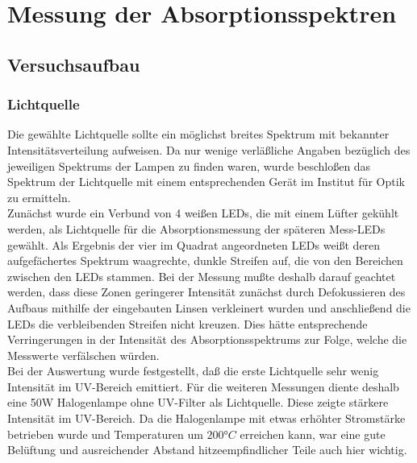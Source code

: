 \documentclass[11pt]{scrartcl}
\begin{document}


\section{Messung der Absorptionsspektren}

\subsection{Versuchsaufbau}
\subsubsection{Lichtquelle} %
Die gew\"ahlte Lichtquelle sollte ein m\"oglichst breites Spektrum mit bekannter Intensit\"atsverteilung aufweisen. Da nur wenige verl\"a\ss{}liche Angaben bez\"uglich des jeweiligen Spektrums der Lampen zu finden waren, wurde beschlo\ss{}en das Spektrum der Lichtquelle mit einem entsprechenden Ger\"at im Institut f\"ur Optik zu ermitteln.\\
Zun\"achst wurde ein Verbund von 4 wei\ss{}en LEDs, die mit einem L\"ufter gek\"uhlt werden, als Lichtquelle f\"ur die Absorptionsmessung der sp\"ateren Mess-LEDs gew\"ahlt. Als Ergebnis der vier im Quadrat angeordneten LEDs wei\ss{}t deren aufgef\"achertes Spektrum waagrechte, dunkle Streifen auf, die von den Bereichen zwischen den LEDs stammen. Bei der Messung mu\ss{}te deshalb darauf geachtet werden, dass diese Zonen geringerer Intensit\"at zun\"achst durch Defokussieren des Aufbaus mithilfe der eingebauten Linsen verkleinert wurden und anschlie\ss{}end die LEDs die verbleibenden Streifen nicht kreuzen. Dies h\"atte entsprechende Verringerungen in der Intensit\"at des Absorptionsspektrums zur Folge, welche die Messwerte verf\"alschen w\"urden.\\
Bei der Auswertung wurde festgestellt, da\ss{} die erste Lichtquelle sehr wenig Intensit\"at im UV-Bereich emittiert. F\"ur die weiteren Messungen diente deshalb eine 50W Halogenlampe ohne UV-Filter als Lichtquelle. Diese zeigte st\"arkere Intensit\"at im UV-Bereich. Da die Halogenlampe mit etwas erh\"ohter Stromst\"arke betrieben wurde und Temperaturen um $200°C$ erreichen kann, war eine gute Bel\"uftung und ausreichender Abstand hitzeempfindlicher Teile auch hier wichtig.
\end{document}
